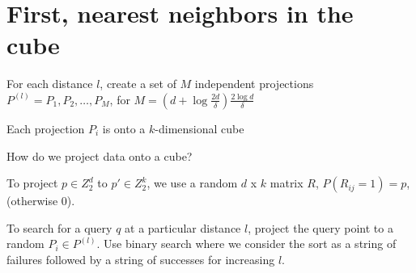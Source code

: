 \documentclass{article}
\begin{document}
\section{First, nearest neighbors in the cube}
For each distance $l$, create a set of $M$ independent projections  $P^{(l)} = P_1, P_2, \ldots, P_M$, for $M = (d + \log \frac{2d}{\delta}) \frac{2 \log d}{\delta} $

Each projection $P_i$ is onto a $k$-dimensional cube


How do we project data onto a cube?

To project $p \in Z^d_2$ to $p' \in Z^k_2$, we use a random $d$ x $k$ matrix $R$, $P(R_{ij} = 1) = p$, (otherwise 0).


To search for a query $q$ at a particular distance $l$, project the query point to a random $P_i \in P^{(l)}$. Use binary search where we consider the sort as a string of failures followed by a string of successes for increasing $l$.








 
\end{document}
